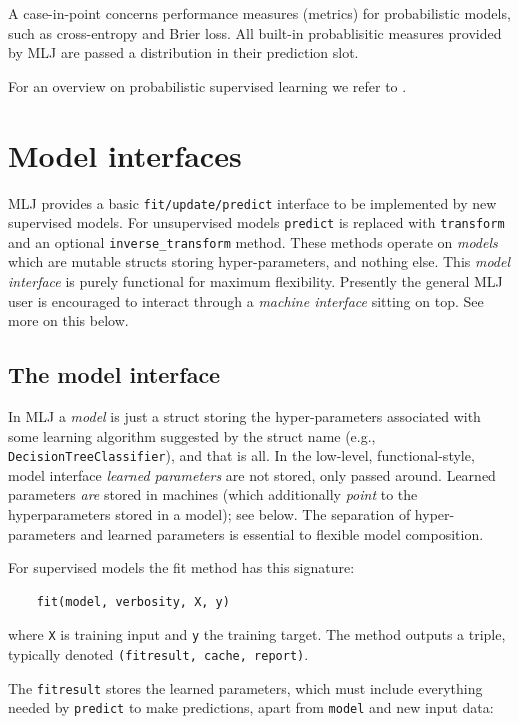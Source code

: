 \documentclass{article}
\begin{document}
A case-in-point concerns performance measures (metrics) for probabilistic models, such as cross-entropy and Brier loss. All built-in probablisitic measures provided by MLJ are passed a distribution in their prediction slot.

For an overview on probabilistic supervised learning we refer to \cite{Gressmann2018}.

\section{Model interfaces}

MLJ provides a basic \texttt{fit/update/predict} interface to be
implemented by new supervised models. For unsupervised models
\texttt{predict} is replaced with \texttt{transform} and an optional
\texttt{inverse\_transform} method. These methods operate on
\textit{models} which are mutable structs storing hyper-parameters,
and nothing else. This \textit{model interface} is purely functional
for maximum flexibility. Presently the general MLJ user is encouraged
to interact through a \textit{machine interface} sitting on top. See
more on this below.

\subsection{The model interface}

In MLJ a \textit{model} is just a struct storing the hyper-parameters
associated with some learning algorithm suggested by the struct name
(e.g., \texttt{DecisionTreeClassifier}), and that is all. In the
low-level, functional-style, model interface \textit{learned
  parameters} are not stored, only passed around. Learned parameters
\textit{are} stored in machines (which additionally \textit{point} to
the hyperparameters stored in a model); see below. The separation of
hyper-parameters and learned parameters is essential to flexible model
composition.

For supervised models the fit method has this signature:

\begin{verbatim}
    fit(model, verbosity, X, y)
\end{verbatim}

where \texttt{X} is training input and \texttt{y} the training target. The method outputs a triple, typically denoted \texttt{(fitresult, cache, report)}.

The \texttt{fitresult} stores the learned parameters, which must include everything needed by \texttt{predict} to make predictions, apart from \texttt{model} and new input data:
\end{document}
